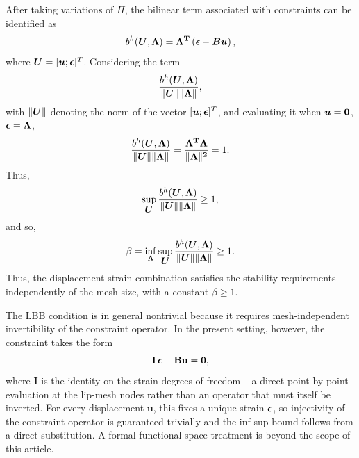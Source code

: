 \documentclass[10pt]{cas-sc}
\newenvironment{addedblock}
{\begingroup\color{blue!80}}
{\endgroup}
\begin{document}
\begin{addedblock}
	
	After taking variations of $\Pi$, the bilinear term associated with constraints can be identified as
	\begin{equation}
		b^h(\mbox{\boldmath $U$},\bf \Lambda) = \bf \Lambda ^T \left(\mbox{\boldmath $\epsilon$} - \mbox{\boldmath $B$} \mbox{\boldmath $u$} \right),
	\end{equation}
	where $\mbox{\boldmath $U$} = [\mbox{\boldmath $u$} ; \mbox{\boldmath $\epsilon$} ]^T$. Considering the term 
	\[    \frac{ b^h(\mbox{\boldmath $U$},\bf \Lambda)}{\|\mbox{\boldmath $U$} \| \| \bf \Lambda\|} , \]
	with $ \|\mbox{\boldmath $U$} \|$ denoting the norm of the vector $[\mbox{\boldmath $u$} ; \mbox{\boldmath $\epsilon$} ]^T$, and evaluating it when $\mbox{\boldmath $u$} = \bf 0$, $\mbox{\boldmath $\epsilon$} = \bf \Lambda$,
	\begin{equation}
		\frac{ b^h(\mbox{\boldmath $U$},\bf \Lambda)}{\|\mbox{\boldmath $U$} \| \| \bf \Lambda\|} =  \frac{\bf \Lambda ^T \bf \Lambda }{\| \bf \Lambda\|^2} = 1.
	\end{equation}
	Thus,
	\begin{equation}
		\sup _{\mbox{\boldmath $U$}} \frac{ b^h(\mbox{\boldmath $U$},\bf \Lambda)}{\|\mbox{\boldmath $U$} \| \| \bf \Lambda\|}  \geq 1,
	\end{equation}
	and so,
	\begin{equation}
		\beta = \inf_{\bf \Lambda} \sup _{\mbox{\boldmath $U$}} 	\frac{ b^h(\mbox{\boldmath $U$},\bf \Lambda)}{\|\mbox{\boldmath $U$} \| \| \bf \Lambda\|}  \geq 1.
	\end{equation}
	Thus, the displacement-strain combination satisfies the stability requirements independently of the mesh size, with a constant $\beta \geq 1$. 
	
	The LBB condition is in general nontrivial because it requires mesh-independent invertibility of the constraint operator. In the present setting, however, the constraint takes the form
	\begin{equation*}
		\mathbf{I}\,\mbox{\boldmath $\epsilon$} - \mathbf{B}\mathbf{u} = \mathbf{0},
	\end{equation*}
	where $\mathbf{I}$ is the identity on the strain degrees of freedom -- a direct point-by-point evaluation at the lip-mesh nodes rather than an operator that must itself be inverted. For every displacement $\mathbf{u}$, this fixes a unique strain $\mbox{\boldmath $\epsilon$}$, so injectivity of the constraint operator is guaranteed trivially and the inf-sup bound follows from a direct substitution. A formal functional-space treatment is beyond the scope of this article.
	
\end{addedblock}
%
%
%
\printbibliography
\end{document}
